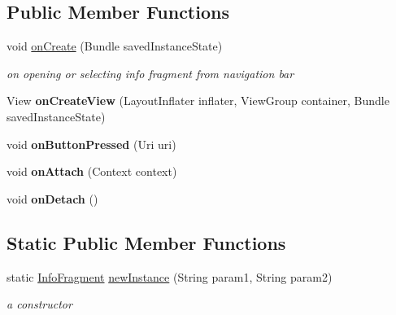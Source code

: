 \subsection*{Public Member Functions}
\begin{DoxyCompactItemize}
\item 
void \hyperlink{classcom_1_1example_1_1sel_1_1lostfound_1_1InfoFragment_a1a9382b4b0ceacfc464559a897fa7656}{on\+Create} (Bundle saved\+Instance\+State)
\begin{DoxyCompactList}\small\item\em on opening or selecting info fragment from navigation bar \end{DoxyCompactList}\item 
View {\bfseries on\+Create\+View} (Layout\+Inflater inflater, View\+Group container, Bundle saved\+Instance\+State)\hypertarget{classcom_1_1example_1_1sel_1_1lostfound_1_1InfoFragment_adb5e6a68883e5b4cb236e0e2e221d7f4}{}\label{classcom_1_1example_1_1sel_1_1lostfound_1_1InfoFragment_adb5e6a68883e5b4cb236e0e2e221d7f4}

\item 
void {\bfseries on\+Button\+Pressed} (Uri uri)\hypertarget{classcom_1_1example_1_1sel_1_1lostfound_1_1InfoFragment_a20ae678d3072262f318a083241372871}{}\label{classcom_1_1example_1_1sel_1_1lostfound_1_1InfoFragment_a20ae678d3072262f318a083241372871}

\item 
void {\bfseries on\+Attach} (Context context)\hypertarget{classcom_1_1example_1_1sel_1_1lostfound_1_1InfoFragment_a07cb9a9ac26dec9f20abce73c04f92e1}{}\label{classcom_1_1example_1_1sel_1_1lostfound_1_1InfoFragment_a07cb9a9ac26dec9f20abce73c04f92e1}

\item 
void {\bfseries on\+Detach} ()\hypertarget{classcom_1_1example_1_1sel_1_1lostfound_1_1InfoFragment_a1fff5a01de59e68f81999e2c558325ba}{}\label{classcom_1_1example_1_1sel_1_1lostfound_1_1InfoFragment_a1fff5a01de59e68f81999e2c558325ba}

\end{DoxyCompactItemize}
\subsection*{Static Public Member Functions}
\begin{DoxyCompactItemize}
\item 
static \hyperlink{classcom_1_1example_1_1sel_1_1lostfound_1_1InfoFragment}{Info\+Fragment} \hyperlink{classcom_1_1example_1_1sel_1_1lostfound_1_1InfoFragment_adb1e26f4f2a3a0f918bff5c5df58e695}{new\+Instance} (String param1, String param2)
\begin{DoxyCompactList}\small\item\em a constructor \end{DoxyCompactList}\end{DoxyCompactItemize}



